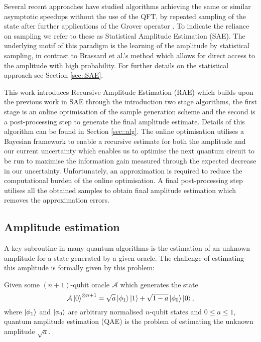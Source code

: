 Several recent approaches have studied algorithms achieving the same or similar asymptotic speedups without the use of the QFT, by repeated sampling of the state after further applications of the Grover operator \cite{aaronson_2021_q_approx_counting, suzuki_2020_amp_without_phase, wie_2019_simpler_q_counting}. To indicate the reliance on sampling we refer to these as Statistical Amplitude Estimation (SAE). The underlying motif of this paradigm is the learning of the amplitude by statistical sampling, in contrast to Brassard et al.'s method which allows for direct access to the amplitude with high probability. For further details on the statistical approach see Section \ref{sec::SAE}.


This work introduces Recursive Amplitude Estimation (RAE) which builds upon the previous work in SAE through the introduction two stage algorithms, the first stage is an online optimisation of the sample generation scheme and the second is a post-processing step to generate the final amplitude estimate. Details of this algorithm can be found in Section \ref{sec::alg}. The online optimisation utilises a Bayesian framework to enable a recursive estimate for both the amplitude and our current uncertainty which enables us to optimise the next quantum circuit to be run to maximise the information gain measured through the expected decrease in our uncertainty. Unfortunately, an approximation is required to reduce the computational burden of the online optimisation. A final post-processing step utilises all the obtained samples to obtain final amplitude estimation which removes the approximation errors.

\subsection{Amplitude estimation}
A key subroutine in many quantum algorithms is the estimation of an unknown amplitude for a state generated by a given oracle. The challenge of estimating this amplitude is formally given by this problem:
\begin{problem}
	Given some $(n+1)$-qubit oracle $\mathcal{A}$ which generates the state
	\[
	\mathcal{A} \ket{0}^{\otimes n+1} = \sqrt{a} \ket{\phi_1} \ket{1} + \sqrt{1-a} \ket{\phi_0} \ket{0},
	\]
	where $\ket{\phi_1}$ and $\ket{\phi_0}$ are arbitrary normalised $n$-qubit states and $0 \leq a \leq  1$, quantum amplitude estimation (QAE) is the problem of estimating the unknown amplitude $\sqrt{a}$.
\end{problem}

